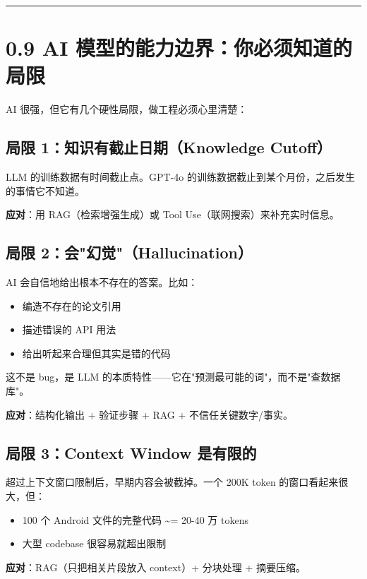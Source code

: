 \bigskip\hrule\bigskip

\section{0.9 AI 模型的能力边界：你必须知道的局限}

AI 很强，但它有几个硬性局限，做工程必须心里清楚：


\subsection{局限 1：知识有截止日期（Knowledge Cutoff）}

LLM 的训练数据有时间截止点。GPT-4o 的训练数据截止到某个月份，之后发生的事情它不知道。


\textbf{应对}：用 RAG（检索增强生成）或 Tool Use（联网搜索）来补充实时信息。


\subsection{局限 2：会"幻觉"（Hallucination）}

AI 会自信地给出根本不存在的答案。比如：

\begin{itemize}[leftmargin=2em]
\item 编造不存在的论文引用
\item 描述错误的 API 用法
\item 给出听起来合理但其实是错的代码
\end{itemize}

这不是 bug，是 LLM 的本质特性------它在"预测最可能的词"，而不是"查数据库"。


\textbf{应对}：结构化输出 + 验证步骤 + RAG + 不信任关键数字/事实。


\subsection{局限 3：Context Window 是有限的}

超过上下文窗口限制后，早期内容会被截掉。一个 200K token 的窗口看起来很大，但：

\begin{itemize}[leftmargin=2em]
\item 100 个 Android 文件的完整代码 \textasciitilde{}= 20-40 万 tokens
\item 大型 codebase 很容易就超出限制
\end{itemize}

\textbf{应对}：RAG（只把相关片段放入 context）+ 分块处理 + 摘要压缩。


